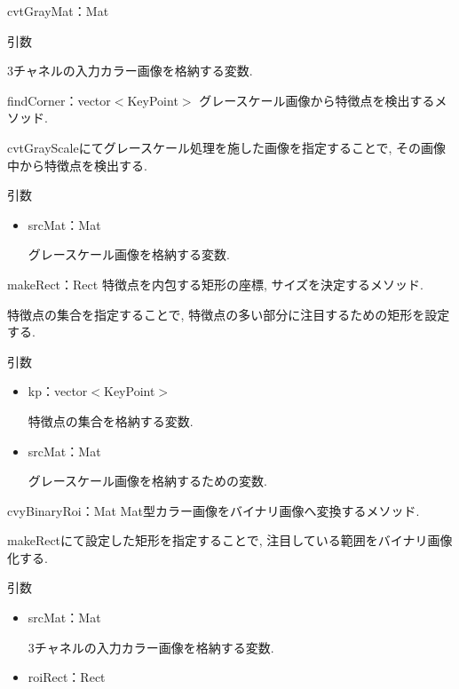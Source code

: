 \begin{description}
\begin{itemize}
\begin{itembox}[l]{cvtGrayMat：Mat}
\begin{itembox}[l]{引数}
\begin{itemize}
3チャネルの入力カラー画像を格納する変数.
\end{itemize}
\end{itembox}
\end{itembox}

\begin{itembox}[l]{findCorner：vector$<$KeyPoint$>$}
グレースケール画像から特徴点を検出するメソッド.

cvtGrayScaleにてグレースケール処理を施した画像を指定することで, その画像中から特徴点を検出する.

\begin{itembox}[l]{引数}
\begin{itemize}
\item srcMat：Mat

グレースケール画像を格納する変数.
\end{itemize}
\end{itembox}
\end{itembox}

\begin{itembox}[l]{makeRect：Rect}
特徴点を内包する矩形の座標, サイズを決定するメソッド.

特徴点の集合を指定することで, 特徴点の多い部分に注目するための矩形を設定する.

\begin{itembox}[l]{引数}
\begin{itemize}
\item kp：vector$<$KeyPoint$>$

特徴点の集合を格納する変数.

\item srcMat：Mat

グレースケール画像を格納するための変数.
\end{itemize}
\end{itembox}
\end{itembox}

\begin{itembox}[l]{cvyBinaryRoi：Mat}
Mat型カラー画像をバイナリ画像へ変換するメソッド.

makeRectにて設定した矩形を指定することで, 注目している範囲をバイナリ画像化する.

\begin{itembox}[l]{引数}
\begin{itemize}
\item srcMat：Mat

3チャネルの入力カラー画像を格納する変数.

\item roiRect：Rect


\end{itemize}
\end{itembox}
\end{itembox}
\end{itemize}
\end{description}

